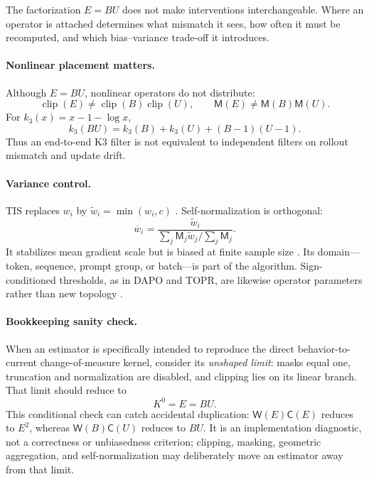 \documentclass[10pt,twocolumn]{article}
\newcommand{\B}{B}
\newcommand{\U}{U}
\newcommand{\E}{E}
\newcommand{\clip}{\operatorname{clip}}
\newcommand{\Mask}{\mathsf{M}}
\newcommand{\Weight}{\mathsf{W}}
\newcommand{\Shape}{\mathsf{C}}
\begin{document}
The factorization \(\E=\B\U\) does not make interventions interchangeable.  Where an operator is attached determines what mismatch it sees, how often it must be recomputed, and which bias--variance trade-off it introduces.

\paragraph{Nonlinear placement matters.}
Although \(\E=\B\U\), nonlinear operators do not distribute:
\begin{equation}
\clip(\E)\ne\clip(\B)\clip(\U),\qquad
\Mask(\E)\ne\Mask(\B)\Mask(\U).
\end{equation}
For \(k_3(x)=x-1-\log x\),
\begin{equation}
    k_3(\B\U)=k_3(\B)+k_3(\U)+(\B-1)(\U-1).
\end{equation}
Thus an end-to-end K3 filter is not equivalent to independent filters on rollout mismatch and update drift.

\paragraph{Variance control.}
TIS replaces \(w_i\) by \(\widetilde w_i=\min(w_i,c)\) \citep{ionides2008tis}.  Self-normalization is orthogonal:
\begin{equation}
    \overline w_i=\frac{\widetilde w_i}
    {\sum_j\Mask_j\widetilde w_j/\sum_j\Mask_j}.
    \label{eq:snis}
\end{equation}
It stabilizes mean gradient scale but is biased at finite sample size \citep{owen2013mc}.  Its domain---token, sequence, prompt group, or batch---is part of the algorithm.  Sign-conditioned thresholds, as in DAPO and TOPR, are likewise operator parameters rather than new topology \citep{yu2025dapo,leroux2025topr}.

\paragraph{Bookkeeping sanity check.}
When an estimator is specifically intended to reproduce the direct behavior-to-current change-of-measure kernel, consider its \emph{unshaped limit}: masks equal one, truncation and normalization are disabled, and clipping lies on its linear branch.  That limit should reduce to
\begin{equation}
    K^0=\E=\B\U.
    \label{eq:conservation}
\end{equation}
This conditional check can catch accidental duplication: \(\Weight(\E)\Shape(\E)\) reduces to \(\E^2\), whereas \(\Weight(\B)\Shape(\U)\) reduces to \(\B\U\).  It is an implementation diagnostic, not a correctness or unbiasedness criterion; clipping, masking, geometric aggregation, and self-normalization may deliberately move an estimator away from that limit.
\end{document}
